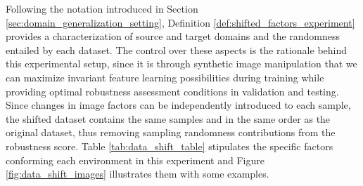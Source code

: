 Following the notation introduced in Section \ref{sec:domain_generalization_setting}, Definition 
\ref{def:shifted_factors_experiment} provides a characterization of source and target domains and
the randomness entailed by each dataset. The control over these aspects is the rationale behind
this experimental setup, since it is through synthetic image manipulation that we can maximize
invariant feature learning possibilities during training while providing optimal robustness
assessment conditions in validation and testing. Since changes in image factors can be independently 
introduced to each sample, the shifted dataset contains the same samples and in the same order
as the original dataset, thus removing sampling randomness contributions from the robustness score. 
Table \ref{tab:data_shift_table} stipulates the specific factors conforming each environment in this
experiment and Figure \ref{fig:data_shift_images} illustrates them with some examples.

